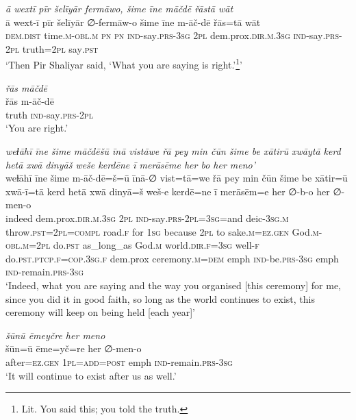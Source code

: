 \ea \label{ZP.126}
\textit{ā wextī pīr šelīyār fermāwo, šime īne māčdē řāstā wāt} \\ 
\gll ā wext-ī pīr šelīyār ∅-fermāw-o šime īne m-āč-dē řās=tā wāt \\ 
 \textsc{dem.dist} time\textsc{.m}\textsc{-obl}\textsc{.m} \textsc{pn} \textsc{pn} \textsc{ind-}say\textsc{.prs}\textsc{-3sg} \textsc{2pl} dem.prox\textsc{.dir}\textsc{.m}\textsc{.3sg} \textsc{ind-}say\textsc{.prs}-\textsc{2pl} truth=\textsc{2pl} say\textsc{.pst} \\ 
\glt `Then Pir Shaliyar said, ‘What you are saying is right.’\footnote{Lit. You said this; you told the truth.}'
\z 
 
\ea \label{ZP.127}
\textit{řās māčdē} \\ 
\gll řās m-āč-dē \\ 
 truth \textsc{ind-}say\textsc{.prs}-\textsc{2pl} \\ 
\glt `You are right.'
\z 
 
\ea \label{ZP.128}
\textit{weɫāhī īne šime māčdēšū īnā vistāwe řā pey min čūn šime be xātirū xwāytā kerd hetā xwā dinyāš weše kerdēne ī merāsēme her bo her meno’} \\ 
\gll weɫāhī īne šime m-āč-dē=š=ū īnā-∅ vist=tā=we řā pey min čūn šime be xātir=ū xwā-ī=tā kerd hetā xwā dinyā=š weš-e kerdē=ne ī merāsēm=e her ∅-b-o her ∅-men-o \\ 
 indeed dem.prox\textsc{.dir}\textsc{.m}\textsc{.3sg} \textsc{2pl} \textsc{ind-}say\textsc{.prs}-\textsc{2pl}\textsc{=3sg}=and deic\textsc{-3sg}\textsc{.m} throw\textsc{.pst}=\textsc{2pl}\textsc{=compl} road\textsc{.f} for \textsc{1sg} because \textsc{2pl} to sake\textsc{.m}\textsc{\textsc{=ez.gen}} God\textsc{.m}\textsc{-obl}\textsc{.m}=\textsc{2pl} do\textsc{.pst} as\_long\_as God\textsc{.m} world\textsc{.dir}\textsc{.f}\textsc{=3sg} well\textsc{-f} do\textsc{.pst}\textsc{.ptcp}\textsc{.f}\textsc{=cop}\textsc{.3sg}\textsc{.f} dem.prox ceremony\textsc{.m}\textsc{=dem} emph \textsc{ind-}be\textsc{.prs}\textsc{-3sg} emph \textsc{ind-}remain\textsc{.prs}\textsc{-3sg} \\ 
\glt `Indeed, what you are saying and the way you organised [this ceremony] for me, since you did it in good faith, so long as the world continues to exist, this ceremony will keep on being held [each year]'
\z 
 
\ea \label{ZP.129}
\textit{šūnū ēmeyčre her meno} \\ 
\gll šūn=ū ēme=yč=re her ∅-men-o \\ 
 after\textsc{\textsc{=ez.gen}} \textsc{1pl}\textsc{=add}\textsc{=\textsc{post}} emph \textsc{ind-}remain\textsc{.prs}\textsc{-3sg} \\ 
\glt `It will continue to exist after us as well.'
\z 
 
